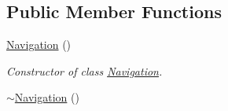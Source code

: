 \subsection*{Public Member Functions}
\begin{DoxyCompactItemize}
\item 
\hyperlink{class_navigation_a81fdffdefe46340da5fa6c570066b42b}{Navigation} ()\hypertarget{class_navigation_a81fdffdefe46340da5fa6c570066b42b}{}\label{class_navigation_a81fdffdefe46340da5fa6c570066b42b}

\begin{DoxyCompactList}\small\item\em Constructor of class \hyperlink{class_navigation}{Navigation}. \end{DoxyCompactList}\item 
\hyperlink{class_navigation_addd4022d716df48f4e55a1db69361ba7}{$\sim$\+Navigation} ()\hypertarget{class_navigation_addd4022d716df48f4e55a1db69361ba7}{}\label{class_navigation_addd4022d716df48f4e55a1db69361ba7}


\end{DoxyCompactItemize}
